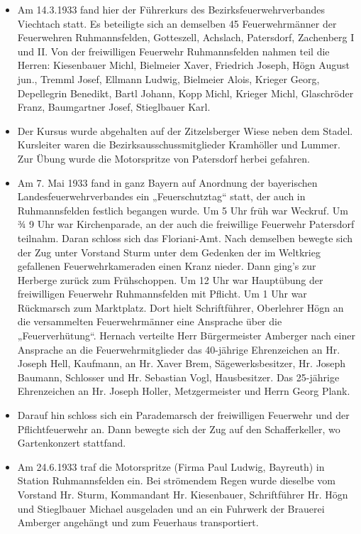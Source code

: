 \documentclass[12pt,a4paper]{book}
\begin{document}
\begin{itemize}
\item Am 14.3.1933 fand hier der Führerkurs des
Bezirksfeuerwehrverbandes Viechtach statt. Es beteiligte sich an
demselben 45 Feuerwehrmänner der Feuerwehren Ruhmannsfelden, Gotteszell,
Achslach, Patersdorf, Zachenberg I und II. Von der freiwilligen
Feuerwehr Ruhmannsfelden nahmen teil die Herren: Kiesenbauer Michl,
Bielmeier Xaver, Friedrich Joseph, Högn August jun., Tremml Josef,
Ellmann Ludwig, Bielmeier Alois, Krieger Georg, Depellegrin Benedikt,
Bartl Johann, Kopp Michl, Krieger Michl, Glaschröder Franz, Baumgartner
Josef, Stieglbauer Karl.

\item Der Kursus wurde abgehalten auf der Zitzelsberger Wiese neben dem
Stadel. Kursleiter waren die Bezirksausschussmitglieder Kramhöller und
Lummer. Zur Übung wurde die Motorspritze von Patersdorf herbei gefahren.

\item Am 7. Mai 1933 fand in ganz Bayern auf Anordnung der bayerischen
Landesfeuerwehrverbandes ein „Feuerschutztag“ statt, der auch in
Ruhmannsfelden festlich begangen wurde. Um 5 Uhr früh war Weckruf. Um ¾
9 Uhr war Kirchenparade, an der auch die freiwillige Feuerwehr
Patersdorf teilnahm. Daran schloss sich das Floriani-Amt. Nach demselben
bewegte sich der Zug unter Vorstand Sturm unter dem Gedenken der im
Weltkrieg gefallenen Feuerwehrkameraden einen Kranz nieder. Dann ging’s
zur Herberge zurück zum Frühschoppen. Um 12 Uhr war Hauptübung der
freiwilligen Feuerwehr Ruhmannsfelden mit Pflicht. Um 1 Uhr war
Rückmarsch zum Marktplatz. Dort hielt Schriftführer, Oberlehrer Högn an
die versammelten Feuerwehrmänner eine Ansprache über die
„Feuerverhütung“. Hernach verteilte Herr Bürgermeister Amberger nach
einer Ansprache an die Feuerwehrmitglieder das 40-jährige Ehrenzeichen
an Hr. Joseph Hell, Kaufmann, an Hr. Xaver Brem, Sägewerksbesitzer, Hr.
Joseph Baumann, Schlosser und Hr. Sebastian Vogl, Hausbesitzer. Das
25-jährige Ehrenzeichen an Hr. Joseph Holler, Metzgermeister und Herrn
Georg Plank.

\item Darauf hin schloss sich ein Parademarsch der freiwilligen
Feuerwehr und der Pflichtfeuerwehr an. Dann bewegte sich der Zug auf den
Schafferkeller, wo Gartenkonzert stattfand.

\item Am 24.6.1933 traf die Motorspritze (Firma Paul Ludwig, Bayreuth)
in Station Ruhmannsfelden ein. Bei strömendem Regen wurde dieselbe vom
Vorstand Hr. Sturm, Kommandant Hr. Kiesenbauer, Schriftführer Hr. Högn
und Stieglbauer Michael ausgeladen und an ein Fuhrwerk der Brauerei
Amberger angehängt und zum Feuerhaus transportiert.


\end{itemize}
\end{document}
